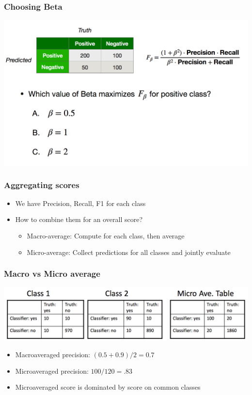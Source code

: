 \begin{frame}
\frametitle{Choosing Beta}
\includegraphics[scale=0.25]{figures/classifiers/beta.png}
\end{frame}

\begin{frame}
\frametitle{Aggregating scores}
\begin{itemize}[<+->]
\item We have Precision, Recall, F1 for each class
\item How to combine them for an overall score?
  \begin{itemize}
  \item Macro-average: Compute for each class, then average
  \item Micro-average: Collect predictions for all classes and jointly evaluate
  \end{itemize}
\end{itemize}
\end{frame}

\begin{frame}
\frametitle{Macro vs Micro average}
\includegraphics[scale=0.25]{figures/classifiers/averaging.png}
\begin{itemize}[<+->]
\item Macroaveraged precision: $(0.5+0.9)/2=0.7$
\item Microaveraged precision: $100/120=.83$
\item Microaveraged score is dominated by score on common classes
\end{itemize}
\end{frame}

